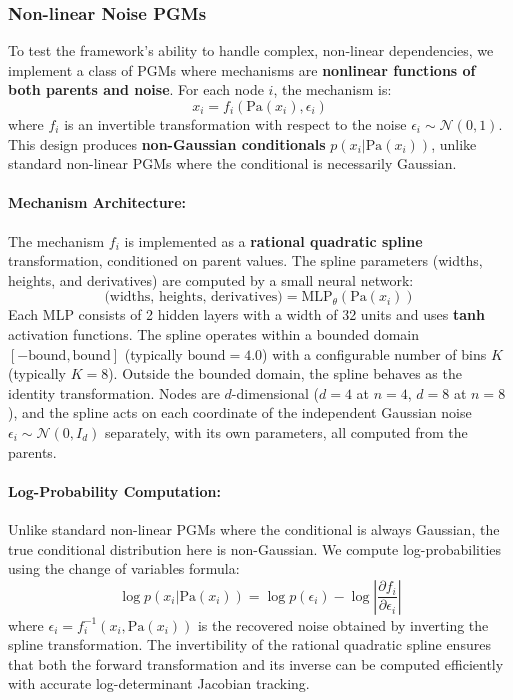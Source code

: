 \subsubsection{Non-linear Noise PGMs}
To test the framework's ability to handle complex, non-linear dependencies, we implement a class of PGMs where mechanisms are \textbf{nonlinear functions of both parents and noise}. For each node $i$, the mechanism is:
\begin{equation}
     x_i = f_i(\text{Pa}(x_i), \epsilon_i)
\end{equation}
where $f_i$ is an invertible transformation with respect to the noise $\epsilon_i \sim \mathcal{N}(0, 1)$. This design produces \textbf{non-Gaussian conditionals} $p(x_i | \text{Pa}(x_i))$, unlike standard non-linear PGMs where the conditional is necessarily Gaussian.

\paragraph{Mechanism Architecture:}
The mechanism $f_i$ is implemented as a \textbf{rational quadratic spline} transformation, conditioned on parent values. The spline parameters (widths, heights, and derivatives) are computed by a small neural network:
\begin{equation}
     \text{(widths, heights, derivatives)} = \text{MLP}_{\theta}(\text{Pa}(x_i))
\end{equation}
Each MLP consists of 2 hidden layers with a width of 32 units and uses \textbf{tanh} activation functions. The spline operates within a bounded domain $[-\text{bound}, \text{bound}]$ (typically $\text{bound} = 4.0$) with a configurable number of bins $K$ (typically $K = 8$). Outside the bounded domain, the spline behaves as the identity transformation. Nodes are $d$-dimensional ($d=4$ at $n=4$, $d=8$ at $n=8$), and the spline acts on each coordinate of the independent Gaussian noise $\epsilon_i \sim \mathcal{N}(0, I_d)$ separately, with its own parameters, all computed from the parents.

\paragraph{Log-Probability Computation:}
Unlike standard non-linear PGMs where the conditional is always Gaussian, the true conditional distribution here is non-Gaussian. We compute log-probabilities using the change of variables formula:
\begin{equation}
     \log p(x_i | \text{Pa}(x_i)) = \log p(\epsilon_i) - \log \left| \frac{\partial f_i}{\partial \epsilon_i} \right|
\end{equation}
where $\epsilon_i = f_i^{-1}(x_i, \text{Pa}(x_i))$ is the recovered noise obtained by inverting the spline transformation. The invertibility of the rational quadratic spline ensures that both the forward transformation and its inverse can be computed efficiently with accurate log-determinant Jacobian tracking.


